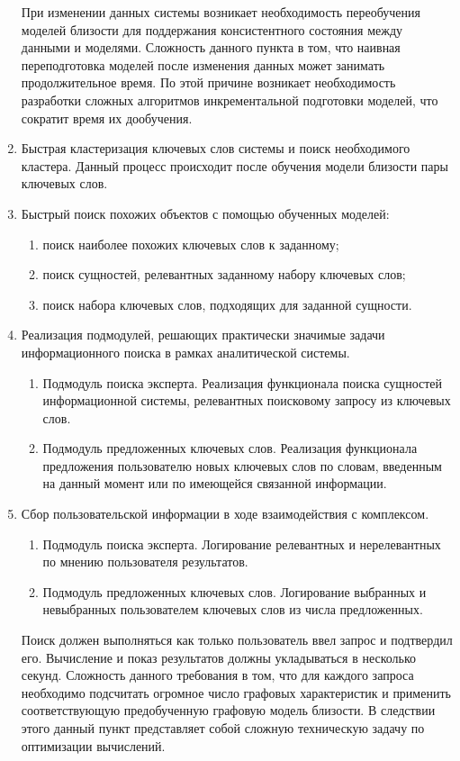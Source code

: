 \begin{enumerate}
\begin{enumerate}
    \end{enumerate}
    При изменении данных системы возникает необходимость переобучения моделей близости для поддержания консистентного состояния между данными и моделями. Сложность данного пункта в том, что наивная переподготовка моделей после изменения данных может занимать продолжительное время. По этой причине возникает необходимость разработки сложных алгоритмов инкрементальной подготовки моделей, что сократит время их дообучения.
    \item Быстрая кластеризация ключевых слов системы и поиск необходимого кластера. Данный процесс происходит после обучения модели близости пары ключевых слов.
    \item Быстрый поиск похожих объектов с помощью обученных моделей:
    \begin{enumerate}
        \item поиск наиболее похожих ключевых слов к заданному;
        \item поиск сущностей, релевантных заданному набору ключевых слов;
        \item поиск набора ключевых слов, подходящих для заданной сущности.
    \end{enumerate}
    \item Реализация подмодулей, решающих практически значимые задачи информационного поиска в рамках аналитической системы.
    \begin{enumerate}
        \item Подмодуль поиска эксперта. Реализация функционала поиска сущностей информационной системы, релевантных поисковому запросу из ключевых слов.
        \item Подмодуль предложенных ключевых слов. Реализация функционала предложения пользователю новых ключевых слов по словам, введенным на данный момент или по имеющейся связанной информации.
    \end{enumerate}
    \item Сбор пользовательской информации в ходе взаимодействия с комплексом.
    \begin{enumerate}
        \item Подмодуль поиска эксперта. Логирование релевантных и нерелевантных по мнению пользователя результатов.
        \item Подмодуль предложенных ключевых слов. Логирование выбранных и невыбранных пользователем ключевых слов из числа предложенных.
    \end{enumerate}
    Поиск должен выполняться как только пользователь ввел запрос и подтвердил его. Вычисление и показ результатов должны укладываться в несколько секунд. Сложность данного требования в том, что для каждого запроса необходимо подсчитать огромное число графовых характеристик и применить соответствующую предобученную графовую модель близости. В следствии этого данный пункт представляет собой сложную техническую задачу по оптимизации вычислений.

\end{enumerate}
